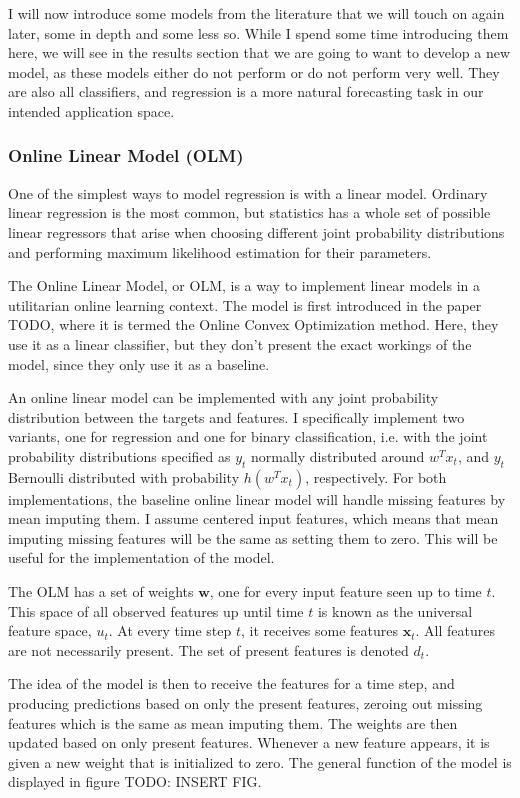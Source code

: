 I will now introduce some models from the literature that we will touch on
again later, some in depth and some less so. While I spend some time
introducing them here, we will see in the results section that we are going to
want to develop a new model, as these models either do not perform or do not
perform very well. They are also all classifiers, and regression is a more
natural forecasting task in our intended application space.

\subsubsection{Online Linear Model (OLM)}

One of the simplest ways to model regression is with a linear model. Ordinary
linear regression is the most common, but statistics has a whole set of
possible linear regressors that arise when choosing different joint probability
distributions and performing maximum likelihood estimation for their
parameters.

The Online Linear Model, or OLM, is a way to implement linear models in a
utilitarian online learning context. The model is first introduced in the paper
TODO, where it is termed the Online Convex Optimization method. Here, they use
it as a linear classifier, but they don't present the exact workings of the
model, since they only use it as a baseline.

An online linear model can be implemented with any joint probability
distribution between the targets and features. I specifically implement two
variants, one for regression and one for binary classification, i.e. with the
joint probability distributions specified as $y_t$ normally distributed around
$w^T x_t$, and $y_t$ Bernoulli distributed with probability $h(w^T x_t)$,
respectively. For both implementations, the baseline online linear model will
handle missing features by mean imputing them. I assume centered input
features, which means that mean imputing missing features will be the same as
setting them to zero. This will be useful for the implementation of the model.

The OLM has a set of weights $\mathbf w$, one for every input feature seen up
to time $t$. This space of all observed features up until time $t$ is known as
the universal feature space, $u_t$. At every time step $t$, it receives some
features $\mathbf x_t$. All features are not necessarily present. The set of
present features is denoted $d_t$.

The idea of the model is then to receive the features for a time step, and
producing predictions based on only the present features, zeroing out missing
features which is the same as mean imputing them. The weights are then updated
based on only present features. Whenever a new feature appears, it is given a
new weight that is initialized to zero. The general function of the model is displayed
in figure TODO: INSERT FIG.

